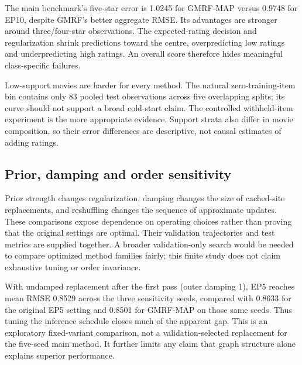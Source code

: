 The main benchmark's five-star error is 1.0245 for GMRF-MAP versus 0.9748 for
EP10, despite GMRF's better aggregate RMSE. Its advantages are stronger around
three/four-star observations. The expected-rating decision and regularization
shrink predictions toward the centre, overpredicting low ratings and
underpredicting high ratings. An overall score therefore hides meaningful
class-specific failures.

Low-support movies are harder for every method. The natural zero-training-item
bin contains only 83 pooled test observations across five overlapping splits;
its curve should not support a broad cold-start claim. The controlled
withheld-item experiment is the more appropriate evidence. Support strata
also differ in movie composition, so their error differences are descriptive,
not causal estimates of adding ratings.

\subsection{Prior, damping and order sensitivity}
\begin{table}[!htbp]\centering\small

\caption{Fixed EP5 sensitivity variants, mean $\pm$ SD over seeds 42--44.
Each varies one operating choice; the main configuration is not reselected
using these test outcomes. Reshuffled ADF is the first pass of that order.}
\end{table}
Prior strength changes regularization, damping changes the size of cached-site
replacements, and reshuffling changes the sequence of approximate updates.
These comparisons expose dependence on operating choices rather than proving
that the original settings are optimal. Their validation trajectories and
test metrics are supplied together. A broader validation-only search would
be needed to compare optimized method families fairly; this finite study
does not claim exhaustive tuning or order invariance.

With undamped replacement after the first pass (outer damping 1), EP5 reaches
mean RMSE 0.8529 across the three sensitivity seeds, compared with 0.8633 for
the original EP5 setting and 0.8501 for GMRF-MAP on those same seeds.
Thus tuning the inference schedule closes much of the apparent gap. This is
an exploratory fixed-variant comparison, not a validation-selected replacement
for the five-seed main method. It further limits any claim that graph structure
alone explains superior performance.
